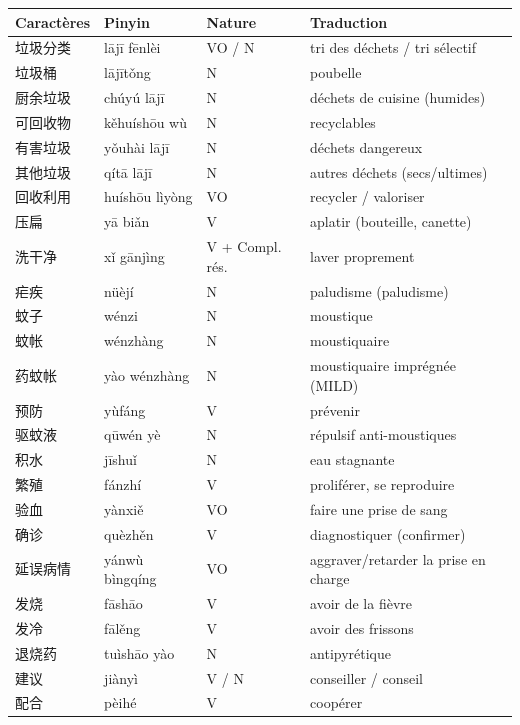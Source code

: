 \documentclass[11pt]{article}
\begin{document}
\begin{definition}
\begin{center}\begin{tabularx}{\linewidth}{|X|X|X|X|}\hline \rowcolor{popblueL} \textbf{Caractères} & \textbf{Pinyin} & \textbf{Nature} & \textbf{Traduction} \\ \hline
垃圾分类 & lājī fēnlèi & VO / N & tri des déchets / tri sélectif \\ \hline
垃圾桶 & lājītǒng & N & poubelle \\ \hline
厨余垃圾 & chúyú lājī & N & déchets de cuisine (humides) \\ \hline
可回收物 & kěhuíshōu wù & N & recyclables \\ \hline
有害垃圾 & yǒuhài lājī & N & déchets dangereux \\ \hline
其他垃圾 & qítā lājī & N & autres déchets (secs/ultimes) \\ \hline
回收利用 & huíshōu lìyòng & VO & recycler / valoriser \\ \hline
压扁 & yā biǎn & V & aplatir (bouteille, canette) \\ \hline
洗干净 & xǐ gānjìng & V + Compl. rés. & laver proprement \\ \hline
疟疾 & nüèjí & N & paludisme (paludisme) \\ \hline
蚊子 & wénzi & N & moustique \\ \hline
蚊帐 & wénzhàng & N & moustiquaire \\ \hline
药蚊帐 & yào wénzhàng & N & moustiquaire imprégnée (MILD) \\ \hline
预防 & yùfáng & V & prévenir \\ \hline
驱蚊液 & qūwén yè & N & répulsif anti-moustiques \\ \hline
积水 & jīshuǐ & N & eau stagnante \\ \hline
繁殖 & fánzhí & V & proliférer, se reproduire \\ \hline
验血 & yànxiě & VO & faire une prise de sang \\ \hline
确诊 & quèzhěn & V & diagnostiquer (confirmer) \\ \hline
延误病情 & yánwù bìngqíng & VO & aggraver/retarder la prise en charge \\ \hline
发烧 & fāshāo & V & avoir de la fièvre \\ \hline
发冷 & fālěng & V & avoir des frissons \\ \hline
退烧药 & tuìshāo yào & N & antipyrétique \\ \hline
建议 & jiànyì & V / N & conseiller / conseil \\ \hline
配合 & pèihé & V & coopérer \\ \hline
\end{tabularx}\end{center}
\end{definition}
\end{document}

